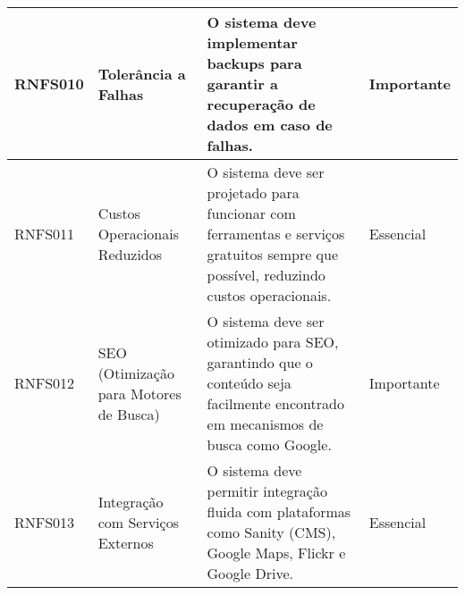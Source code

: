 {\begin{longtable}{|>{\raggedright}p{2.5cm}|>{\raggedright}p{4cm}|p{6cm}|>{\raggedright}p{2cm}|}
\hline
RNFS010 & Tolerância a Falhas & O sistema deve implementar backups para garantir a recuperação de dados em caso de falhas. & Importante \\
\hline
RNFS011 & Custos Operacionais Reduzidos & O sistema deve ser projetado para funcionar com ferramentas e serviços gratuitos sempre que possível, reduzindo custos operacionais. & Essencial \\
\hline
RNFS012 & SEO (Otimização para Motores de Busca) & O sistema deve ser otimizado para SEO, garantindo que o conteúdo seja facilmente encontrado em mecanismos de busca como Google. & Importante \\
\hline
RNFS013 & Integração com Serviços Externos & O sistema deve permitir integração fluida com plataformas como Sanity (CMS), Google Maps, Flickr e Google Drive. & Essencial \\
\hline
\end{longtable}
} %